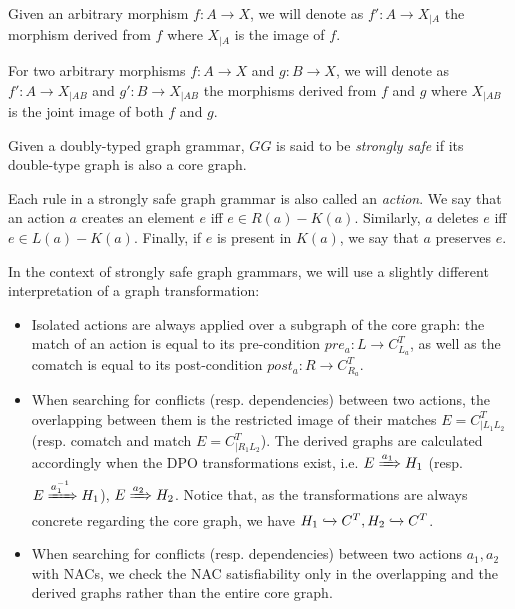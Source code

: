 \begin{notation} Given an arbitrary morphism $f : A \rightarrow X$, we will denote as $f' : A \rightarrow X_{|A}$ the morphism derived from $f$ where $X_{|A}$ is the image of $f$.

  For two arbitrary morphisms $f : A \rightarrow X$ and $g : B \rightarrow X$, we will denote as $f' : A \rightarrow X_{|AB}$ and $g' : B \rightarrow X_{|AB}$ the morphisms derived from $f$ and $g$ where $X_{|AB}$ is the joint image of both $f$ and $g$.
\end{notation}

\begin{definition}\label{def:strongly-safe-grammar} Given \doublyTypedGraphGrammarCore{} a doubly-typed graph grammar, $GG$ is said to be \emph{strongly safe} if its double-type graph is also a core graph.

  Each rule in a strongly safe graph grammar is also called an \emph{action}. We say that an action $a$ creates an element $e$ iff $e \in R(a) - K(a)$. Similarly, $a$ deletes $e$ iff \mbox{$e \in L(a) - K(a)$}. Finally, if $e$ is present in $K(a)$, we say that $a$ preserves $e$.
\end{definition}

In the context of strongly safe graph grammars, we will use a slightly different interpretation of a graph transformation:
  
\begin{itemize} 
  \item Isolated actions are always applied over a subgraph of the core graph: the match of an action is equal to its pre-condition $pre_a : L \rightarrow C^T_{L_a}$, as well as the comatch is equal to its post-condition $post_a : R \rightarrow C^T_{R_a}$.

  \item When searching for conflicts (resp. dependencies) between two actions, the overlapping between them is the restricted image of their matches $E = C^T_{|L_1L_2}$ (resp. comatch and match $E = C^T_{|R_1L_2}$). The derived graphs are calculated accordingly when the DPO transformations exist, i.e. \mbox{$E \xRightarrow{a_1} H_1$} (resp. \mbox{$E \xRightarrow{a^{-1}_1} H_1$}), \mbox{$E \xRightarrow{a_2} H_2$}. Notice that, as the transformations are always concrete regarding the core
    graph, we have $H_1 \xhookrightarrow{} C^T, H_2 \xhookrightarrow{} C^T$.

  \item When searching for conflicts (resp. dependencies) between two actions $a_1,a_2$ with NACs, we check the NAC satisfiability only in the overlapping and the derived graphs rather than the entire core graph.
\end{itemize}

